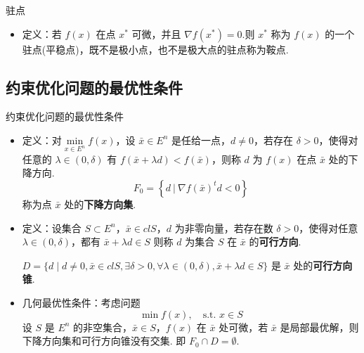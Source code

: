 \begin{remark}
    驻点\begin{itemize}
        \item 定义：若 $f(x)$ 在点 $x^*$ 可微，并且 $\nabla f(x^*) = 0$.则 $x^*$ 称为 $f(x)$ 的一个驻点(平稳点)，既不是极小点，也不是极大点的驻点称为鞍点.
    \end{itemize}
\end{remark}

\subsection{约束优化问题的最优性条件}
\begin{remark}
    约束优化问题的最优性条件
    \begin{itemize}
        \item 定义：对$\underset{x \in E^n}{\min}f(x)$，设 $\bar{x} \in E^n$ 是任给一点，$d\neq 0$，若存在 $\delta > 0$，使得对任意的 $\lambda \in (0, \delta)$ 有 $f(\bar{x} + \lambda d) < f(\bar{x})$，则称 $d$ 为 $f(x)$ 在点 $\bar{x}$ 处的下降方向.\[F_0 = \left\{d\ |\ \nabla f(\bar{x})^td < 0\right\}\]称为点 $\bar{x}$ 处的\textbf{下降方向集}.
        \item 定义：设集合 $S \subset E^n$，$\bar{x} \in clS$，$d$ 为非零向量，若存在数 $\delta > 0$，使得对任意 $\lambda \in (0, \delta)$，都有 $\bar{x} + \lambda d \in S$ 则称 $d$ 为集合 $S$ 在 $\bar{x}$ 的\textbf{可行方向}. 
        
        $D=\{d \mid d \neq 0, \bar{x} \in c l S, \exists \delta>0, \forall \lambda \in(0, \delta), \bar{x}+\lambda d \in S\}$ 是 $\bar{x}$ 处的\textbf{可行方向锥}.
        \item 几何最优性条件：考虑问题\[\min f(x), \quad \text{s.t. } x \in S\]设 $S$ 是 $E^n$ 的非空集合，$\bar{x} \in S$，$f(x)$ 在 $\bar{x}$ 处可微，若 $\bar{x}$ 是局部最优解，则下降方向集和可行方向锥没有交集. 即 $F_0\cap D = \emptyset$.
    \end{itemize}
\end{remark}

